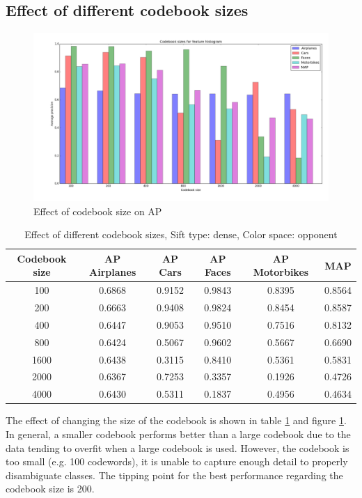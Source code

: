 \subsection{Effect of different codebook sizes}

\begin{figure}[H]
\includegraphics[width=\textwidth]{../plots/cluster_size_feature_histograms}
\caption{Effect of codebook size on AP}
\label{plot:codebook}
\end{figure}
\begin{table}[H]
\begin{tabular}{|c|ccccc|}
\hline
\textbf{Codebook size} & \textbf{AP Airplanes} & \textbf{AP Cars} & \textbf{AP Faces} & \textbf{AP Motorbikes} & \textbf{MAP}\\
\hline
100& 0.6868 & 0.9152 & 0.9843 & 0.8395 & 0.8564\\
200 & 0.6663 & 0.9408 & 0.9824 & 0.8454 & 0.8587\\
400 & 0.6447 & 0.9053 & 0.9510 & 0.7516 & 0.8132\\
800 & 0.6424 & 0.5067 & 0.9602 & 0.5667 & 0.6690\\
1600 & 0.6438 & 0.3115 & 0.8410 & 0.5361 & 0.5831\\
2000 & 0.6367 & 0.7253 & 0.3357 & 0.1926 & 0.4726\\
4000 & 0.6430 & 0.5311 & 0.1837 & 0.4956 & 0.4634\\
\hline
\end{tabular}
\caption{Effect of different codebook sizes, Sift type: dense, Color space: opponent}
\label{tab:clusters}
\end{table}

The effect of changing the size of the codebook is shown in table \ref{tab:clusters} and figure \ref{plot:codebook}. In general, a smaller codebook performs better than a large codebook due to the data tending to overfit when a large codebook is used. However, the codebook is too small (e.g. 100 codewords), it is unable to capture enough detail to properly disambiguate classes. The tipping point for the best performance regarding the codebook size is 200.